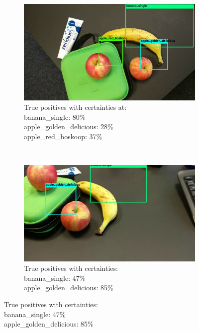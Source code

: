 \begin{figure}[H]
	\centering
	\begin{subfigure}[b]{0.48\textwidth}
		\includegraphics[width=\textwidth]{figures/yolo1}
		\caption{True positives with certainties at:\\ banana_single: 80\%\\ apple_golden_delicious: 28\%\\ apple_red_boskoop: 37\%}
		\label{fig:yolo1}
	\end{subfigure}
	~
	\begin{subfigure}[b]{0.48\textwidth}
		\includegraphics[width=\textwidth]{figures/yolo2}
		\caption{True positives with certainties:\\ banana_single: 47\%\\
			apple_golden_delicious: 85\%\\}
		\label{fig:yolo2}
	\end{subfigure}


\end{figure}
